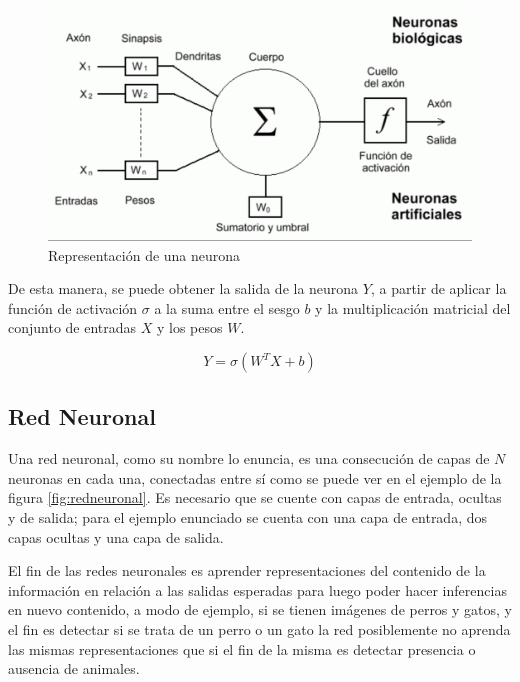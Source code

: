  
\begin{figure}[!h]
\centering
\includegraphics[width=.8\linewidth]{images/representacion_neurona}
\caption[Representación de una neurona]{Representación de una neurona \cite{russell2016artificial}}
\label{fig:representacion_neurona}
\end{figure}

De esta manera, se puede obtener la salida de la neurona \(Y\), a partir de aplicar la función de activación \(\sigma\) a la suma entre el sesgo \(b\) y la multiplicación matricial del conjunto de entradas \(X\) y los pesos \(W\).

\begin{equation}
Y=\sigma\left(W^{T} X+b\right)
\end{equation}


\subsection{Red Neuronal}\label{red_neuronal}
 Una red neuronal, como su nombre lo enuncia, es una consecución de capas de \(N\) neuronas en cada una, conectadas entre sí como se puede ver en el ejemplo de la figura \ref{fig:redneuronal}. Es necesario que se cuente con capas de entrada, ocultas y de salida; para el ejemplo enunciado se cuenta con una capa de entrada, dos capas ocultas y una capa de salida. 
 
 El fin de las redes neuronales es aprender representaciones del contenido de la información en relación a las salidas esperadas para luego poder hacer inferencias en nuevo contenido, a modo de ejemplo, si se tienen imágenes de perros y gatos, y el fin es detectar si se trata de un perro o un gato la red posiblemente no aprenda las mismas representaciones que si el fin de la misma es detectar presencia o ausencia de animales.
 
